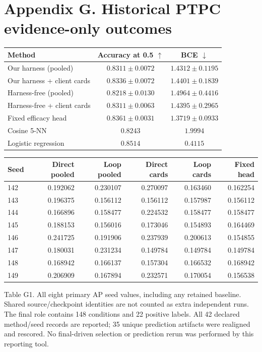 \section*{Appendix G. Historical PTPC evidence-only outcomes}
\begin{center}\small\setlength{\tabcolsep}{6pt}
\begin{tabular}{lcc}
\toprule
Method & Accuracy at 0.5 $\uparrow$ & BCE $\downarrow$ \\
\midrule
Our harness (pooled) & $0.8311 \pm 0.0072$ & $1.4312 \pm 0.1195$ \\
Our harness + client cards & $0.8336 \pm 0.0072$ & $1.4401 \pm 0.1839$ \\
Harness-free (pooled) & $0.8218 \pm 0.0130$ & $1.4964 \pm 0.4416$ \\
Harness-free + client cards & $0.8311 \pm 0.0063$ & $1.4395 \pm 0.2965$ \\
Fixed efficacy head & $0.8361 \pm 0.0031$ & $1.3719 \pm 0.0933$ \\
Cosine 5-NN & $0.8243$ & $1.9994$ \\
Logistic regression & $0.8514$ & $0.4115$ \\
\bottomrule
\end{tabular}
\end{center}
\begin{center}\footnotesize\setlength{\tabcolsep}{4pt}
\begin{tabular}{lrrrrr}
\toprule
Seed & Direct pooled & Loop pooled & Direct cards & Loop cards & Fixed head \\
\midrule
142 & 0.192062 & 0.230107 & 0.270097 & 0.163460 & 0.162254 \\
143 & 0.196375 & 0.156112 & 0.156112 & 0.157987 & 0.156112 \\
144 & 0.166896 & 0.158477 & 0.224532 & 0.158477 & 0.158477 \\
145 & 0.188153 & 0.156016 & 0.173046 & 0.154893 & 0.164469 \\
146 & 0.241725 & 0.191906 & 0.237939 & 0.200613 & 0.154855 \\
147 & 0.180031 & 0.231234 & 0.149784 & 0.149784 & 0.149784 \\
148 & 0.168942 & 0.166137 & 0.157304 & 0.166532 & 0.168942 \\
149 & 0.206909 & 0.167894 & 0.232571 & 0.170054 & 0.156538 \\
\bottomrule
\end{tabular}
\end{center}
Table G1. All eight primary AP seed values, including any retained baseline. Shared source/checkpoint identities are not counted as extra independent runs.
The final role contains 148 conditions and 22 positive labels. All 42 declared method/seed records are reported; 35 unique prediction artifacts were realigned and rescored. No final-driven selection or prediction rerun was performed by this reporting tool.
